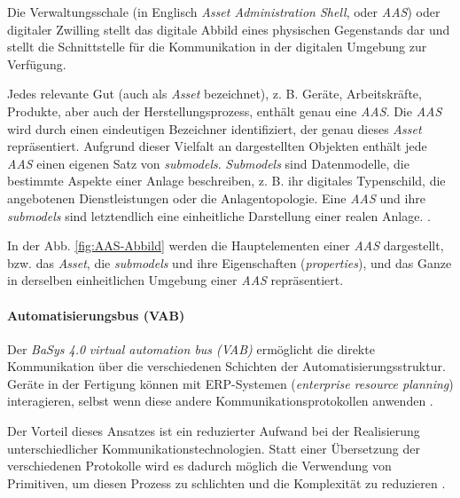Die Verwaltungsschale (in Englisch \textit{Asset Administration Shell}, oder \textit{AAS}) oder digitaler Zwilling stellt das digitale Abbild eines physischen Gegenstands dar und stellt die Schnittstelle für die Kommunikation in der digitalen Umgebung zur Verfügung. \cite{plattformindustrie4.0DiskussionspapierVerwaltungsschalePraxis}

Jedes relevante Gut (auch als \textit{Asset} bezeichnet), z. B. Geräte, Arbeitskräfte, Produkte, aber auch der Herstellungsprozess, enthält genau eine \textit{AAS}. Die \textit{AAS} wird durch einen eindeutigen Bezeichner identifiziert, der genau dieses \textit{Asset} repräsentiert. Aufgrund dieser Vielfalt an dargestellten Objekten enthält jede \textit{AAS} einen eigenen Satz von \textit{submodels}. \textit{Submodels} sind Datenmodelle, die bestimmte Aspekte einer Anlage beschreiben, z. B. ihr digitales Typenschild, die angebotenen Dienstleistungen oder die Anlagentopologie. Eine \textit{AAS} und ihre \textit{submodels} sind letztendlich eine einheitliche Darstellung einer realen Anlage. \cite{eclipsefoundationinc.BaSyxEclipsepedia}.

In der Abb. \ref{fig:AAS-Abbild} werden die Hauptelementen einer \textit{AAS} dargestellt, bzw. das \textit{Asset}, die \textit{submodels} und ihre Eigenschaften (\textit{properties}), und das Ganze in derselben einheitlichen Umgebung einer \textit{AAS} repräsentiert.





\paragraph{Automatisierungsbus (VAB)}
Der \textit{BaSys 4.0} \textit{virtual automation bus (VAB)} ermöglicht die direkte Kommunikation über die verschiedenen Schichten der Automatisierungsstruktur. Geräte in der Fertigung können mit ERP-Systemen (\textit{enterprise resource planning}) interagieren, selbst wenn diese andere Kommunikationsprotokollen anwenden \cite{fraunhofer-institutfurexperimentellessoftwareengineeringieseBaSysFlyer}.

Der Vorteil dieses Ansatzes ist ein reduzierter Aufwand bei der Realisierung unterschiedlicher Kommunikationstechnologien. Statt einer Übersetzung der verschiedenen Protokolle wird es dadurch möglich die Verwendung von Primitiven, um diesen Prozess zu schlichten und die Komplexität zu reduzieren \cite{eclipsefoundationinc.BaSyxEclipsepedia}.

